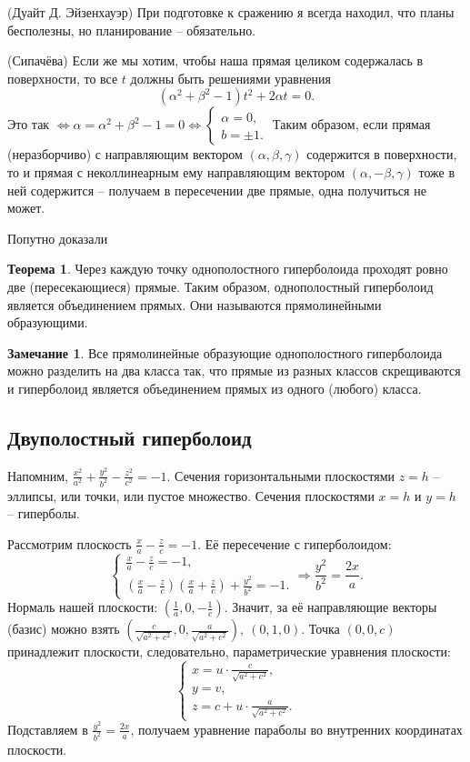 \documentclass[a4paper, 12pt]{article}
\theoremstyle{definition}
\newtheorem*{theorem}{Теорема}
\newtheorem*{remark}{Замечание}
\begin{document}
(Дуайт Д. Эйзенхауэр) При подготовке к сражению я всегда находил, что планы бесполезны, но планирование – обязательно.

(Сипачёва) Если же мы хотим, чтобы наша прямая целиком содержалась в поверхности, то все $t$ должны быть решениями уравнения
\[(\alpha^2 + \beta^2 - 1)t^2 + 2 \alpha t = 0.\]
Это так $\Leftrightarrow \alpha = \alpha^2 + \beta^2 - 1 = 0 \Leftrightarrow \begin{cases}
    \alpha = 0, \\
    b = \pm 1.
\end{cases}$
Таким образом, если прямая (неразборчиво) с направляющим вектором $(\alpha, \beta, \gamma)$ содержится в поверхности, то и прямая с неколлинеарным ему направляющим вектором $(\alpha, -\beta, \gamma)$ тоже в ней содержится – получаем в пересечении две прямые, одна получиться не может.

Попутно доказали
\begin{theorem}
    Через каждую точку однополостного гиперболоида проходят ровно две (пересекающиеся) прямые. Таким образом, однополостный гиперболоид является объединением прямых. Они называются прямолинейными образующими.
\end{theorem}

\begin{remark}
    Все прямолинейные образующие однополостного гиперболоида\\ можно разделить на два класса так, что прямые из разных классов скрещиваются и гиперболоид является объединением прямых из одного (любого) класса.
\end{remark}


\subsection{Двуполостный гиперболоид}
Напомним, $\frac{x^2}{a^2} + \frac{y^2}{b^2} - \frac{z^2}{c^2} = -1$.
Сечения горизонтальными плоскостями $z = h$ – эллипсы, или точки, или пустое множество.
Сечения плоскостями $x = h$ и $y = h$ – гиперболы.

Рассмотрим плоскость $\frac{x}{a} - \frac{z}{c} = -1$.
Её пересечение с гиперболоидом:
\[\begin{cases}
    \frac{x}{a} - \frac{z}{c} = -1, \\
    \left(\frac{x}{a} - \frac{z}{c}\right) \left(\frac{x}{a} + \frac{z}{c}\right) + \frac{y^2}{b^2} = -1.
\end{cases} \Rightarrow
\frac{y^2}{b^2} = \frac{2x}{a}.\]
Нормаль нашей плоскости: $\left(\frac{1}{a}, 0, -\frac{1}{c}\right)$.
Значит, за её направляющие векторы (базис) можно взять 
$\left(\frac{c}{\sqrt{a^2+c^2}}, 0, \frac{a}{\sqrt{a^2+c^2}}\right), \ (0,1,0)$.
Точка $(0,0,c)$ принадлежит плоскости, следовательно, параметрические уравнения плоскости:
\[\begin{cases}
    x = u \cdot \frac{c}{\sqrt{a^2+c^2}}, \\
    y = v, \\
    z = c + u \cdot \frac{a}{\sqrt{a^2+c^2}}.
\end{cases}\]
Подставляем в $\frac{y^2}{b^2} = \frac{2x}{a}$, получаем уравнение параболы во внутренних координатах плоскости.
\end{document}
